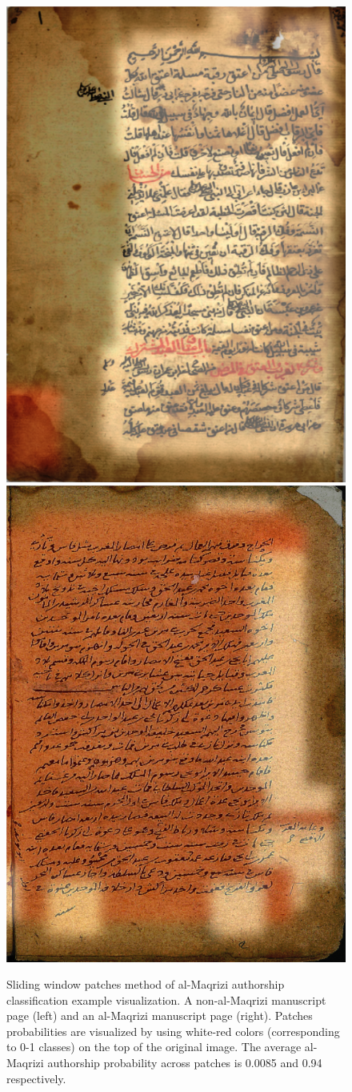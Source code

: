 \documentclass[conference]{IEEEtran}
\begin{document}
\begin{figure}[!t]
	\centering
  \includegraphics[width=0.49\linewidth]{figures/not_al_maqrizi_image_classification_example_fixed.png}
  \includegraphics[width=0.49\linewidth]{figures/sw_al_maqrisi_fixed.png}
  \caption{Sliding window patches method of al-Maqrizi authorship classification example visualization. A non-al-Maqrizi manuscript page (left) and an al-Maqrizi manuscript page (right). Patches probabilities are visualized by using white-red colors (corresponding to 0-1 classes) on the top of the original image. The average al-Maqrizi authorship probability across patches is 0.0085 and 0.94 respectively.}
	\label{fig:al_maqrizi_classification_example_train}
\end{figure}
\end{document}
